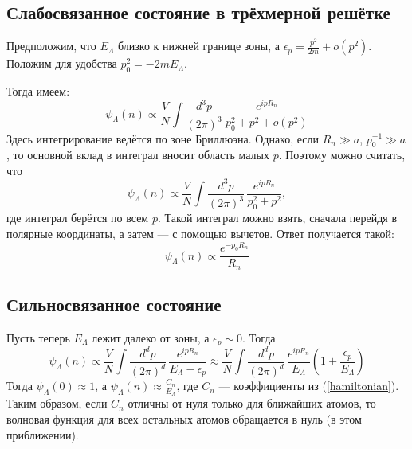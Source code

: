 \documentclass{article}
\begin{document}
\subsection{Слабосвязанное состояние в трёхмерной решётке}
Предположим, что $E_\Lambda$ близко к нижней границе зоны, а 
$\epsilon_p = \frac{p^2}{2m} + o(p^2)$. Положим для удобства $p_0^2 = -2mE_\Lambda$.

Тогда имеем:
\begin{equation}
	\psi_\Lambda(n) 
	\propto \frac{V}{N}\int \frac{d^3 p}{(2\pi)^3}\, \frac{e^{ipR_n}}{p_0^2 + p^2 + o(p^2)}	
\end{equation}
Здесь интегрирование ведётся по зоне Бриллюэна. Однако, если $R_n \gg a$, $p_0^{-1} \gg a$, 
то основной вклад в интеграл вносит область малых $p$. Поэтому можно считать, что
\begin{equation}
	\psi_\Lambda(n) 
	\propto \frac{V}{N}\int \frac{d^3 p}{(2\pi)^3}\, \frac{e^{ipR_n}}{p_0^2 + p^2},
\end{equation}
где интеграл берётся по всем $p$. Такой интеграл можно взять, сначала перейдя в полярные координаты, а затем --- с помощью вычетов.
Ответ получается такой:
\begin{equation}
	\psi_\Lambda(n) \propto \frac{e^{-p_0R_n}}{R_n}
\end{equation}
\subsection{Сильносвязанное состояние}
Пусть теперь $E_\Lambda$ лежит далеко от зоны, а $\epsilon_p \sim 0$. Тогда
\begin{equation}
	\psi_\Lambda(n) 
	\propto \frac{V}{N}\int \frac{d^d p}{(2\pi)^d}\, \frac{e^{ipR_n}}{E_\Lambda - \epsilon_p}
	\approx \frac{V}{N}\int \frac{d^d p}{(2\pi)^d}\, 
			\frac{e^{ipR_n}}{E_\Lambda}\left(1 + \frac{\epsilon_p}{E_\Lambda}\right)
\end{equation}
Тогда $\psi_\Lambda(0) \approx 1$, а 
$\psi_\Lambda(n) \approx \frac{C_n}{E_\Lambda}$, где $C_n$ --- коэффициенты из
(\ref{hamiltonian}). Таким образом, если $C_n$ отличны от нуля только для ближайших
атомов, то волновая функция для всех остальных атомов обращается в нуль (в этом приближении).
 
\end{document}
